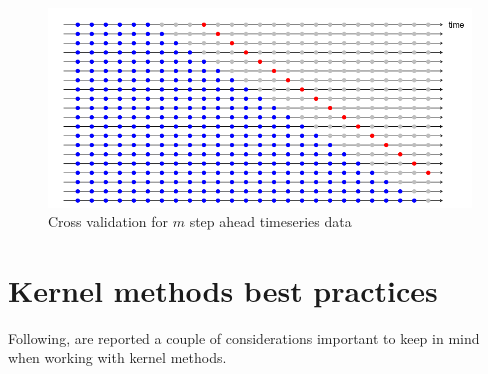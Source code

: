 \begin{figure}
    \includegraphics[width=\textwidth]{images/crossvalidationtimeseries2.png}
    \caption{Cross validation for $m$ step ahead timeseries data \cite{hyndman2018forecasting}}
    \label{fig:crossvalidationtimeseries2}
\end{figure}

\section{Kernel methods best practices}
Following, are reported a couple of considerations important to keep in mind when working with kernel methods.

